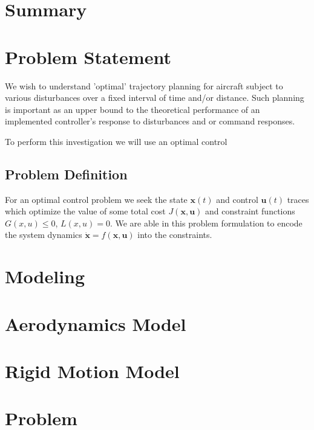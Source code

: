 \documentclass{article}
\begin{document}
\section{Summary}

\section{Problem Statement}

We wish to understand 'optimal' trajectory planning for aircraft subject to various disturbances over a fixed interval of time and/or distance. Such planning is important as an upper  bound to the theoretical performance of an implemented controller's response to disturbances and or command responses.

To perform this investigation we will use an optimal control 

\subsection{Problem Definition}

For an optimal control problem we seek the state $\mathbf{x}(t)$ and control $\mathbf{u}(t)$ traces which optimize the value of some total cost $J(\mathbf{x},\mathbf{u})$ and constraint functions $G(x,u) \leq 0$, $L(x,u) = 0$.
We are able in this problem formulation to encode the system dynamics $\dot{\mathbf{x}} = f(\mathbf{x},\mathbf{u})$ into the constraints. \\

\section{Modeling}

\section{Aerodynamics Model}

\section{Rigid Motion Model}

\section{Problem }
\end{document}
